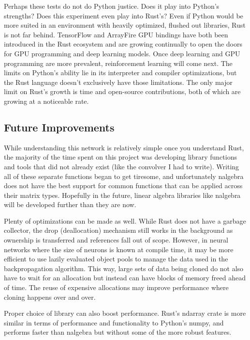 \begin{multicols}{2}
Perhaps these tests do not do Python justice. Does it play into Python's strengths? Does this experiment even play into
Rust's? Even if Python would be more suited in an environment with heavily optimized, flushed out libraries, Rust is
not far behind. TensorFlow and ArrayFire GPU bindings have both been introduced in the Rust ecosystem and are growing
continually to open the doors for GPU programming and deep learning models. Once deep learning and GPU programming are
more prevalent, reinforcement learning will come next. The limits on Python's ability lie in its interpreter and compiler
optimizations, but the Rust language doesn't exclusively have those limitations. The only major limit on Rust's growth is time and
open-source contributions, both of which are growing at a noticeable rate.

\subsection{Future Improvements}
While understanding this network is relatively simple once you understand Rust, the majority of the time spent on this
project was developing library functions and tools that did not already exist (like the convolver I had to write). Writing
all of these separate functions began to get tiresome, and unfortunately nalgebra does not have the best support for common
functions that can be applied across their matrix types. Hopefully in the future, linear algebra libraries like nalgebra
will be developed further than they are now.

Plenty of optimizations can be made as well. While Rust does not have a garbage collector, the drop (deallocation) mechanism
still works in the background as ownership is transferred and references fall out of scope. However, in neural networks
where the size of neurons is known at compile time, it may be more efficient to use lazily evaluated object pools
to manage the data used in the backpropagation algorithm. This way, large sets of data being cloned do not also have to
wait for an allocation but instead can have blocks of memory freed ahead of time. The reuse of expensive allocations
may improve performance where cloning happens over and over.

Proper choice of library can also boost performance. Rust's ndarray crate is more similar in terms of performance
and functionality to Python's numpy, and performs faster than nalgebra but without some of the more robust features.

\end{multicols}
